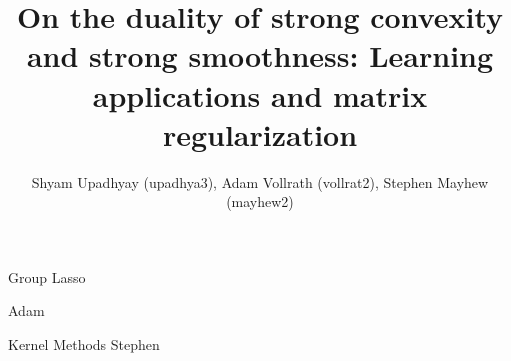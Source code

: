 \documentclass[11pt]{beamer}
\author{Shyam Upadhyay (upadhya3), Adam Vollrath (vollrat2), Stephen Mayhew (mayhew2)}
\title{On the duality of strong convexity and strong smoothness: Learning applications and matrix regularization}
\institute{UIUC}
\date{}
\begin{document}
{\nologo
\begin{frame}
\titlepage
\end{frame}
}




\begin{frame}{Group Lasso}

Adam

\end{frame}

\begin{frame}{Kernel Methods}
Stephen

\end{frame}
\end{document}
